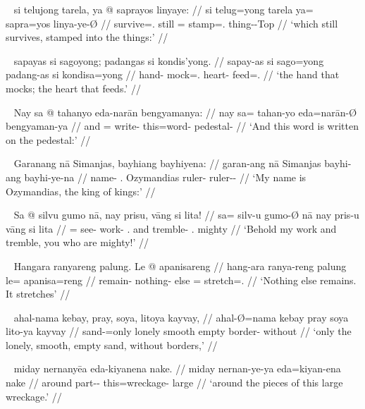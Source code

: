 \ex~\begingl
	\gla si telujong tarela, ya @ saprayos linyaye: //
	\glb si telug=yong tarela ya= sapra=yos linya-ye-Ø //
	\glc \Rel{} survive=\TsgN{}.\Aarg{} still \LocT{}= stamp=\TsgN{}.\Parg{} 
		thing-\Pl{}-Top{} //
	\glft `which still survives, stamped into the things:' //
\endgl\xe

\ex~\begingl
	\gla sapayas si sagoyong; padangas si kondis'yong. //
	\glb sapay-as si sago=yong padang-as si kondisa=yong //
	\glc hand-\Parg{} \Rel{} mock=\TsgN{}.\Aarg{} heart-\Parg{} \Rel{} 
		feed=\TsgN{}.\Aarg{} //
	\glft `the hand that mocks; the heart that feeds.' //
\endgl\xe

\ex~\begingl
	\gla Nay sa @ tahanyo eda-narān bengyamanya: //
	\glb nay sa= tahan-yo eda=narān-Ø bengyaman-ya //
	\glc and \PatT{}= write-\TsgN{} this=word-\Top{} pedestal-\Loc{} //
	\glft `And this word is written on the pedestal:' //
\endgl\xe

\ex~\begingl
	\gla Garanang nā Simanjas, bayhiang bayhiyena: //
	\glb garan-ang nā Simanjas bayhi-ang bayhi-ye-na //
	\glc name-\Aarg{} \Fsg{}.\Gen{} Ozymandias ruler-\Aarg{} 
			ruler-\Pl{}-\Gen{} //
	\glft `My name is Ozymandias, the king of kings:' //
\endgl\xe

\ex~\begingl
	\gla Sa @ silvu gumo nā, nay prisu, vāng si lita! //
	\glb sa= silv-u gumo-Ø nā nay pris-u vāng si lita //
	\glc \PatT{}= see-\Imp{} work-\Top{} \Fsg{}.\Gen{} and tremble-\Imp{}
		\Second{}.\Aarg{} \Rel{} mighty //
	\glft `Behold my work and tremble, you who are mighty!' //
\endgl\xe

\ex~\begingl
	\gla Hangara ranyareng palung. Le @ apanisareng //
	\glb hang-ara ranya-reng palung le= apanisa=reng //
	\glc remain-\TsgI{} nothing-\AargI{} else \PatTI{}= 
		stretch=\TsgI{}.\Aarg{} //
	\glft `Nothing else remains. It stretches' //
\endgl\xe

\ex~\begingl
	\gla ahal-nama kebay, pray, soya, litoya kayvay, //
	\glb ahal-Ø=nama kebay pray soya lito-ya kayvay //
	\glc sand-\Top{}=only lonely smooth empty border-\Top{} without //
	\glft `only the lonely, smooth, empty sand, without borders,' //
\endgl\xe

\ex~\begingl
	\gla miday nernanyēa eda-kiyanena nake. //
	\glb miday nernan-ye-ya eda=kiyan-ena nake //
	\glc around part-\Pl{}-\Loc{} this=wreckage-\Gen{} large //
	\glft `around the pieces of this large wreckage.' //
\endgl\xe
